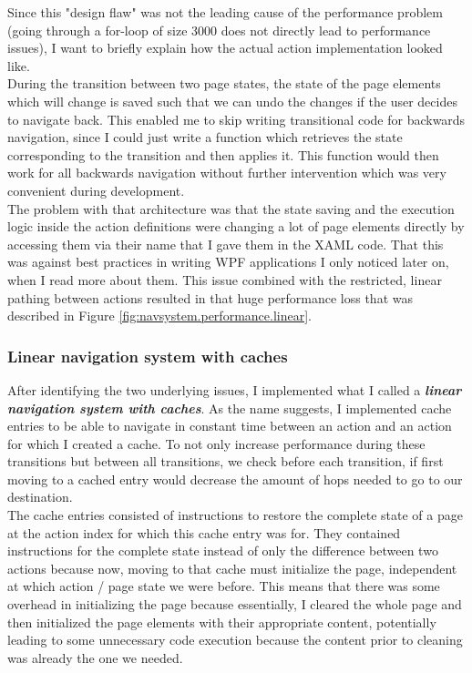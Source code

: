 Since this "design flaw" was not the leading cause of the performance problem (going through a for-loop of size 3000 does not directly lead to performance issues), I want to briefly explain how the actual action implementation looked like.\\
During the transition between two page states, the state of the page elements which will change is saved such that we can undo the changes if the user decides to navigate back. This enabled me to skip writing transitional code for backwards navigation, since I could just write a function which retrieves the state corresponding to the transition and then applies it. This function would then work for all backwards navigation without further intervention which was very convenient during development. \\
The problem with that architecture was that the state saving and the execution logic inside the action definitions were changing a lot of page elements directly by accessing them via their name that I gave them in the XAML code. That this was against best practices in writing WPF applications I only noticed later on, when I read more about them. This issue combined with the restricted, linear pathing between actions resulted in that huge performance loss that was described in Figure \ref{fig:navsystem.performance.linear}.

\subsubsection{Linear navigation system with caches}

After identifying the two underlying issues, I implemented what I called a \textbf{\textit{linear navigation system with caches}}. As the name suggests, I implemented cache entries to be able to navigate in constant time between an action and an action for which I created a cache. To not only increase performance during these transitions but between all transitions, we check before each transition, if first moving to a cached entry would decrease the amount of hops needed to go to our destination. \\
The cache entries consisted of instructions to restore the complete state of a page at the action index for which this cache entry was for. They contained instructions for the complete state instead of only the difference between two actions because now, moving to that cache must initialize the page, independent at which action / page state we were before. This means that there was some overhead in initializing the page because essentially, I cleared the whole page and then initialized the page elements with their appropriate content, potentially leading to some unnecessary code execution because the content prior to cleaning was already the one we needed. 

